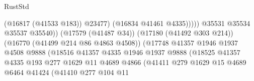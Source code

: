 \begin{lexlean}{RustStd}
\begin{coremodule}
                                                              (@16817 (@41533 @183))
                                                              @23477)
                                                            (@16834 @41461 @4335)))))
                                                    @35531
                                                    @35534
                                                    @35537
                                                    @35540))
                                                (@17579 (@41487 @34))
                                                (@17180 (@41492 @303 @214))
                                                (@16770 (@41499 @214 @86 @4863 @4508))
                                                (@17748
                                                  @41357
                                                  @1946
                                                  @1937
                                                  @4508
                                                  @9888
                                                  (@18516
                                                    @41357
                                                    @4335
                                                    @1946
                                                    @1937
                                                    @9888
                                                    (@18525
                                                      @41357
                                                      @4335
                                                      @193
                                                      @277
                                                      @1629
                                                      @11
                                                      @4689
                                                      @4866
                                                      (@41411
                                                        @279
                                                        @1629
                                                        @15
                                                        @4689
                                                        @6464
                                                        @41424
                                                        (@41410
                                                          @277
                                                          @104
                                                          @11

\end{coremodule}
\end{lexlean}
